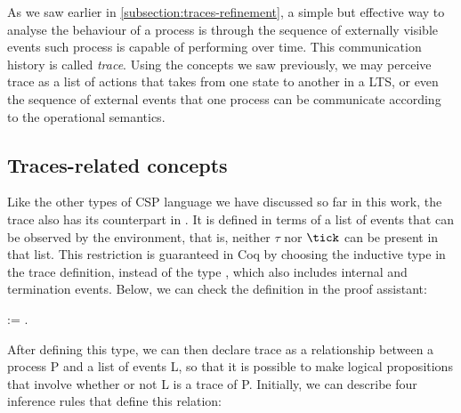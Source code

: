 As we saw earlier in \autoref{subsection:traces-refinement}, a simple but effective way to analyse the behaviour of a process is through the sequence of externally visible events such process is capable of performing over time. This communication history is called \emph{trace}. Using the concepts we saw previously, we may perceive trace as a list of actions that takes from one state to another in a LTS, or even the sequence of external events that one process can be communicate according to the operational semantics.

\subsection{Traces-related concepts}

Like the other types of CSP language we have discussed so far in this work, the trace also has its counterpart in \CSPcoq{}. It is defined in terms of a list of events that can be observed by the environment, that is, neither $ \tau $ nor $ \tick $ can be present in that list. This restriction is guaranteed in Coq by choosing the inductive type  in the trace definition, instead of the type , which also includes internal and termination events. Below, we can check the definition in the proof assistant:

\begin{coqdoccode}
	\coqdocnoindent
	  :=  .\coqdoceol
\end{coqdoccode}

After defining this type, we can then declare trace as a relationship between a process P and a list of events L, so that it is possible to make logical propositions that involve whether or not L is a trace of P. Initially, we can describe four inference rules that define this relation:

